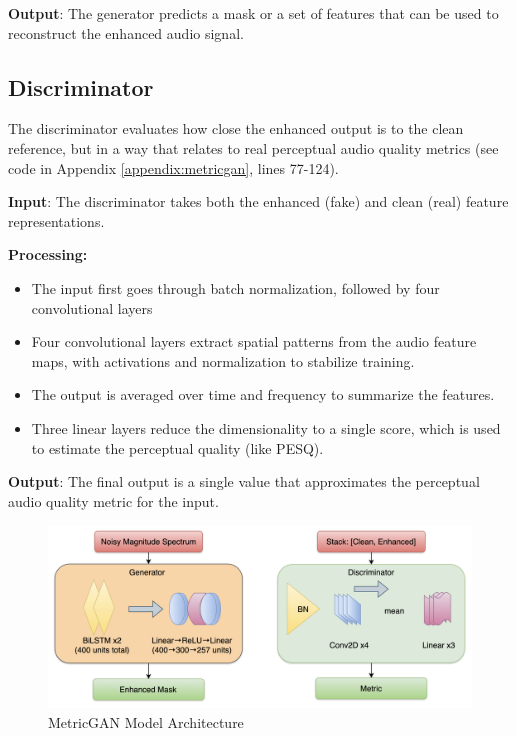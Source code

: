 \textbf{Output}: The generator predicts a mask or a set of features that can be used to reconstruct the enhanced audio signal.


\subsection{Discriminator}

The discriminator evaluates how close the enhanced output is to the clean reference, but in a way that relates to real perceptual audio quality metrics (see code in Appendix \ref{appendix:metricgan}, lines 77-124).

\textbf{Input}: The discriminator takes both the enhanced (fake) and clean (real) feature representations.

\textbf{Processing:}

\begin{itemize}
    \item The input first goes through batch normalization, followed by four convolutional layers
    \item Four convolutional layers extract spatial patterns from the audio feature maps, with activations and normalization to stabilize training.
    \item The output is averaged over time and frequency to summarize the features.
    \item Three linear layers reduce the dimensionality to a single score, which is used to estimate the perceptual quality (like PESQ).
\end{itemize}

\textbf{Output}: The final output is a single value that approximates the perceptual audio quality metric for the input.


\begin{figure}[htbp]
    \centering
    \includegraphics[width=1\linewidth]{figures/MetricGANCodeArch.png}
     \caption{MetricGAN Model Architecture}
    \label{fig:figure8}
\end{figure}


